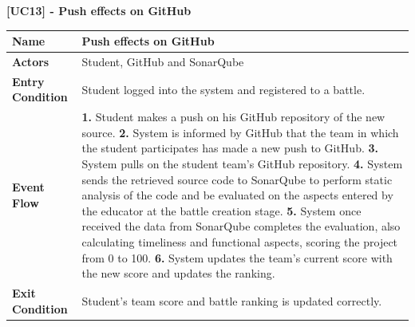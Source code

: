 \clearpage
\raggedright
\textbf{[UC13] - Push effects on GitHub}
\begin{table}[h]
\begin{tabular}{|l|p{12cm}|} \hline 

\rule[-3mm]{0mm}{1cm}
\textbf{Name} & Push effects on GitHub \\ \hline 

\rule[-3mm]{0mm}{1cm}
\textbf{Actors} & Student, GitHub and SonarQube \\ \hline 

\rule[-3mm]{0mm}{1cm}
\textbf{Entry Condition} & Student logged into the system and registered to a battle.
\vspace{2pt}
\\ \hline 

\rule[-3mm]{0mm}{1cm}
\textbf{Event Flow} & 
\textbf{1.} Student makes a push on his GitHub repository of the new source.
\vspace{4pt}
\newline
\textbf{2.} System is informed by GitHub that the team in which the student participates has made a new push to GitHub.
\vspace{4pt}
\newline
\textbf{3.} System pulls on the student team's GitHub repository. 
\vspace{4pt}
\newline
\textbf{4.} System sends the retrieved source code to SonarQube to perform static analysis of the code and be evaluated on the aspects entered by the educator at the battle creation stage.
\vspace{4pt}
\newline
\textbf{5.} System once received the data from SonarQube completes the evaluation, also calculating timeliness and functional aspects, scoring the project from 0 to 100.
\vspace{4pt}
\newline
\textbf{6.} System updates the team's current score with the new score and updates the ranking.

\\\hline 

\rule[-3mm]{0mm}{1cm}
\textbf{Exit Condition} & Student's team score and battle ranking is updated correctly.  \\ \hline

\end{tabular}
\end{table}

